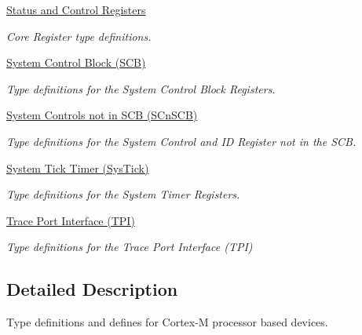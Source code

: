 \begin{DoxyCompactItemize}
\hyperlink{group__CMSIS__CORE}{Status and Control Registers}
\begin{DoxyCompactList}\small\item\em Core Register type definitions. \end{DoxyCompactList}\item 
\hyperlink{group__CMSIS__SCB}{System Control Block (\+S\+C\+B)}
\begin{DoxyCompactList}\small\item\em Type definitions for the System Control Block Registers. \end{DoxyCompactList}\item 
\hyperlink{group__CMSIS__SCnSCB}{System Controls not in S\+C\+B (\+S\+Cn\+S\+C\+B)}
\begin{DoxyCompactList}\small\item\em Type definitions for the System Control and ID Register not in the S\+CB. \end{DoxyCompactList}\item 
\hyperlink{group__CMSIS__SysTick}{System Tick Timer (\+Sys\+Tick)}
\begin{DoxyCompactList}\small\item\em Type definitions for the System Timer Registers. \end{DoxyCompactList}\item 
\hyperlink{group__CMSIS__TPI}{Trace Port Interface (\+T\+P\+I)}
\begin{DoxyCompactList}\small\item\em Type definitions for the Trace Port Interface (T\+PI) \end{DoxyCompactList}\end{DoxyCompactItemize}


\subsection{Detailed Description}
Type definitions and defines for Cortex-\/M processor based devices. 

